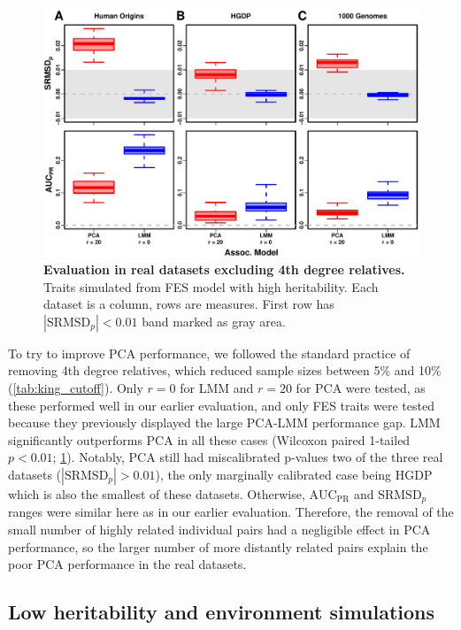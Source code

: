 \documentclass[11pt]{article}
\newcommand{\rmsd}{\text{SRMSD}_p}
\newcommand{\auc}{\text{AUC}_\text{PR}}
\begin{document}
\begin{linenumbers}
\begin{figure}[hp]
  \centering
  \includegraphics[width=\textwidth]{fes/rmsd-auc_king-cutoff-4.pdf}
  \caption{
    {\bf Evaluation in real datasets excluding 4th degree relatives.}
    Traits simulated from FES model with high heritability.
    Each dataset is a column, rows are measures.
    First row has $|\rmsd| < 0.01$ band marked as gray area.
  }
  \label{fig:king_cutoff}
\end{figure}

To try to improve PCA performance, we followed the standard practice of removing 4th degree relatives, which reduced sample sizes between 5\% and 10\% (\cref{tab:king_cutoff}).
Only $r=0$ for LMM and $r=20$ for PCA were tested, as these performed well in our earlier evaluation, and only FES traits were tested because they previously displayed the large PCA-LMM performance gap.
LMM significantly outperforms PCA in all these cases (Wilcoxon paired 1-tailed $p < 0.01$; \cref{fig:king_cutoff}).
Notably, PCA still had miscalibrated p-values two of the three real datasets ($|\rmsd| > 0.01$), the only marginally calibrated case being HGDP which is also the smallest of these datasets.
Otherwise, $\auc$ and $\rmsd$ ranges were similar here as in our earlier evaluation.
Therefore, the removal of the small number of highly related individual pairs had a negligible effect in PCA performance, so the larger number of more distantly related pairs explain the poor PCA performance in the real datasets.


\subsection{Low heritability and environment simulations}


\end{linenumbers}
\end{document}
